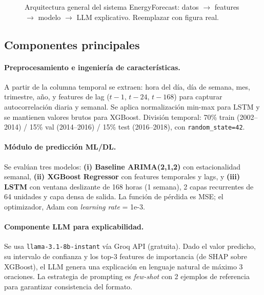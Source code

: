 \documentclass[10pt,twocolumn]{article}
\begin{document}
\begin{figure}[H]
  \centering
  \fbox{\rule{0pt}{3.5cm}\rule{\columnwidth-2\fboxsep}{0pt}}
  \caption{Arquitectura general del sistema EnergyForecast:
           datos $\rightarrow$ features $\rightarrow$ modelo
           $\rightarrow$ LLM explicativo. Reemplazar con figura real.}
  \label{fig:arq}
\end{figure}

\subsection{Componentes principales}

\paragraph{Preprocesamiento e ingeniería de características.}
A partir de la columna temporal se extraen: hora del día,
día de semana, mes, trimestre, año, y features de lag
($t-1$, $t-24$, $t-168$) para capturar autocorrelación
diaria y semanal. Se aplica normalización min-max para LSTM
y se mantienen valores brutos para XGBoost.
División temporal: 70\% train (2002--2014) /
15\% val (2014--2016) / 15\% test (2016--2018),
con \texttt{random\_state=42}.

\paragraph{Módulo de predicción ML/DL.}
Se evalúan tres modelos:
\textbf{(i) Baseline ARIMA(2,1,2)} con estacionalidad semanal,
\textbf{(ii) XGBoost Regressor} con features temporales y lags,
y \textbf{(iii) LSTM} con ventana deslizante de 168 horas
(1 semana), 2 capas recurrentes de 64 unidades y capa
densa de salida. La función de pérdida es MSE; el optimizador,
Adam con \textit{learning rate} = 1e-3.

\paragraph{Componente LLM para explicabilidad.}
Se usa \texttt{llama-3.1-8b-instant} vía Groq API (gratuita).
Dado el valor predicho, su intervalo de confianza y los
top-3 features de importancia (de SHAP sobre XGBoost),
el LLM genera una explicación en lenguaje natural de máximo
3 oraciones. La estrategia de prompting es \textit{few-shot}
con 2 ejemplos de referencia para garantizar consistencia
del formato.
\end{document}
